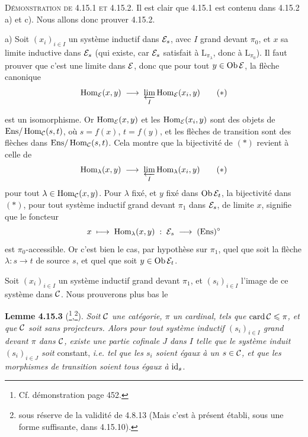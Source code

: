 \textsc{Démonstration de 4.15.1 et 4.15.2.} Il est clair que 4.15.1 est contenu dans 4.15.2 a) et c). Nous allons donc prouver 4.15.2.

a) Soit $(x_i)_{i\in I}$ un système inductif dans $\mathcal{E}_s$, avec $I$ grand devant $\pi_0$, et $x$ sa limite inductive dans $\mathcal{E}_s$ (qui existe, car $\mathcal{E}_s$ satisfait à $\mathrm{L}_{\pi_\lambda}$, donc à $\mathrm{L}_{\pi_0}$). Il faut prouver que c'est une limite dans $\mathcal{E}$, donc que pour tout $y \in \operatorname{Ob}\mathcal{E}$, la flèche canonique
\[
\operatorname{Hom}_{\mathcal{E}}(x,y) \;\longrightarrow\; \varprojlim_{I} \operatorname{Hom}_{\mathcal{E}}(x_i,y) \tag*{$(*)$}
\]

est un isomorphisme. Or $\operatorname{Hom}_{\mathcal{E}}(x,y)$ et les $\operatorname{Hom}_{\mathcal{E}}(x_i,y)$ sont des objets de $\mathrm{Ens}/\operatorname{Hom}_{\mathcal{C}}(s,t)$, où $s = f(x)$, $t = f(y)$, et les flèches de transition sont des flèches dans $\mathrm{Ens}/\operatorname{Hom}_{\mathcal{C}}(s,t)$. Cela montre que la bijectivité de $(*)$ revient à celle de
\[
\operatorname{Hom}_\lambda(x,y) \;\longrightarrow\; \varprojlim_{I} \operatorname{Hom}_\lambda(x_i,y) \tag*{$(*)$}
\]
pour tout $\lambda \in \operatorname{Hom}_{\mathcal{C}}(x,y)$. Pour $\lambda$ fixé, et $y$ fixé dans $\operatorname{Ob}\mathcal{E}_t$, la bijectivité dans $(*)$, pour tout système inductif grand devant $\pi_1$ dans $\mathcal{E}_s$, de limite $x$, signifie que le foncteur
\[
x \;\longmapsto\; \operatorname{Hom}_\lambda(x,y) \;:\; \mathcal{E}_s \;\longrightarrow\; (\mathrm{Ens})^\circ
\]
est $\pi_0$-accessible. Or c'est bien le cas, par hypothèse sur $\pi_1$, quel que soit la flèche $\lambda : s \longrightarrow t$ de source $s$, et quel que soit $y \in \operatorname{Ob}\mathcal{E}_t$.

Soit $(x_i)_{i\in I}$ un système inductif grand devant $\pi_1$, et $(s_i)_{i\in I}$ l'image de ce système dans $\mathcal{C}$. Nous prouverons plus bas le

\textbf{Lemme 4.15.3} (\footnote{Cf. démonstration page 452.},\footnote{sous réserve de la validité de 4.8.13 (Mais c'est à présent établi, sous une forme suffisante, dans 4.15.10).}). \textit{Soit $\mathcal{C}$ une catégorie, $\pi$ un cardinal, tels que} $\operatorname{card}\mathcal{C} \leqslant \pi$\textit{, et que $\mathcal{C}$ soit sans projecteurs. Alors pour tout système inductif $(s_i)_{i\in I}$ grand devant $\pi$ dans $\mathcal{C}$, existe une partie cofinale $J$ dans $I$ telle que le système induit $(s_i)_{i\in J}$ soit} constant, \textit{i.e. tel que les $s_i$ soient égaux à un $s \in \mathcal{C}$, et que les morphismes de transition soient tous égaux à} $\mathrm{id}_s$.

